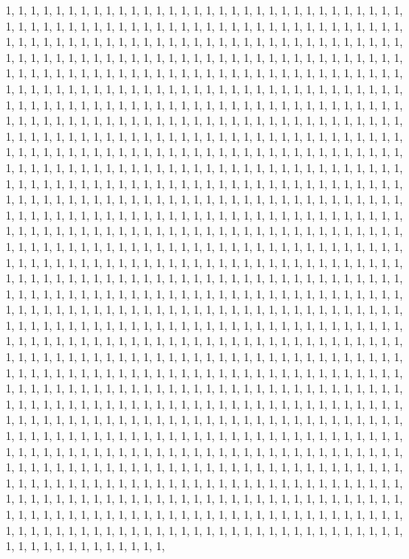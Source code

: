 \documentclass[
]{article}
\begin{document}
\begin{Schunk}
\begin{Soutput}
1, 1, 1, 1, 1, 1, 1, 1, 1, 1, 1, 1, 1, 1, 1, 1, 1, 1, 1, 1, 1, 1, 1, 1, 1, 1, 1, 1, 1, 1, 1, 1, 1, 1, 1, 1, 1, 1, 1, 1, 1, 1, 1, 1, 1, 1, 1, 1, 1, 1, 1, 1, 1, 1, 1, 1, 1, 1, 1, 1, 1, 1, 1, 1, 1, 1, 1, 1, 1, 1, 1, 1, 1, 1, 1, 1, 1, 1, 1, 1, 1, 1, 1, 1, 1, 1, 1, 1, 1, 1, 1, 1, 1, 1, 1, 1, 1, 1, 1, 1, 1, 1, 1, 1, 1, 1, 1, 1, 1, 1, 1, 1, 1, 1, 1, 1, 1, 1, 1, 1, 1, 1, 1, 1, 1, 1, 1, 1, 1, 1, 1, 1, 1, 1, 1, 1, 1, 1, 1, 1, 1, 1, 1, 1, 1, 1, 1, 1, 1, 1, 1, 1, 1, 1, 1, 1, 1, 1, 1, 1, 1, 1, 1, 1, 1, 1, 1, 1, 1, 1, 1, 1, 1, 1, 1, 1, 1, 1, 1, 1, 1, 1, 1, 1, 1, 1, 1, 1, 1, 1, 1, 1, 1, 1, 1, 1, 1, 1, 1, 1, 1, 1, 1, 1, 1, 1, 1, 1, 1, 1, 1, 1, 1, 1, 1, 1, 1, 1, 1, 1, 1, 1, 1, 1, 1, 1, 1, 1, 1, 1, 1, 1, 1, 1, 1, 1, 1, 1, 1, 1, 1, 1, 1, 1, 1, 1, 1, 1, 1, 1, 1, 1, 1, 1, 1, 1, 1, 1, 1, 1, 1, 1, 1, 1, 1, 1, 1, 1, 1, 1, 1, 1, 1, 1, 1, 1, 1, 1, 1, 1, 1, 1, 1, 1, 1, 1, 1, 1, 1, 1, 1, 1, 1, 1, 1, 1, 1, 1, 1, 1, 1, 1, 1, 1, 1, 1, 1, 1, 1, 1, 1, 1, 1, 1, 1, 1, 1, 1, 1, 1, 1, 1, 1, 1, 1, 1, 1, 1, 1, 1, 1, 1, 1, 1, 1, 1, 1, 1, 1, 1, 1, 1, 1, 1, 1, 1, 1, 1, 1, 1, 1, 1, 1, 1, 1, 1, 1, 1, 1, 1, 1, 1, 1, 1, 1, 1, 1, 1, 1, 1, 1, 1, 1, 1, 1, 1, 1, 1, 1, 1, 1, 1, 1, 1, 1, 1, 1, 1, 1, 1, 1, 1, 1, 1, 1, 1, 1, 1, 1, 1, 1, 1, 1, 1, 1, 1, 1, 1, 1, 1, 1, 1, 1, 1, 1, 1, 1, 1, 1, 1, 1, 1, 1, 1, 1, 1, 1, 1, 1, 1, 1, 1, 1, 1, 1, 1, 1, 1, 1, 1, 1, 1, 1, 1, 1, 1, 1, 1, 1, 1, 1, 1, 1, 1, 1, 1, 1, 1, 1, 1, 1, 1, 1, 1, 1, 1, 1, 1, 1, 1, 1, 1, 1, 1, 1, 1, 1, 1, 1, 1, 1, 1, 1, 1, 1, 1, 1, 1, 1, 1, 1, 1, 1, 1, 1, 1, 1, 1, 1, 1, 1, 1, 1, 1, 1, 1, 1, 1, 1, 1, 1, 1, 1, 1, 1, 1, 1, 1, 1, 1, 1, 1, 1, 1, 1, 1, 1, 1, 1, 1, 1, 1, 1, 1, 1, 1, 1, 1, 1, 1, 1, 1, 1, 1, 1, 1, 1, 1, 1, 1, 1, 1, 1, 1, 1, 1, 1, 1, 1, 1, 1, 1, 1, 1, 1, 1, 1, 1, 1, 1, 1, 1, 1, 1, 1, 1, 1, 1, 1, 1, 1, 1, 1, 1, 1, 1, 1, 1, 1, 1, 1, 1, 1, 1, 1, 1, 1, 1, 1, 1, 1, 1, 1, 1, 1, 1, 1, 1, 1, 1, 1, 1, 1, 1, 1, 1, 1, 1, 1, 1, 1, 1, 1, 1, 1, 1, 1, 1, 1, 1, 1, 1, 1, 1, 1, 1, 1, 1, 1, 1, 1, 1, 1, 1, 1, 1, 1, 1, 1, 1, 1, 1, 1, 1, 1, 1, 1, 1, 1, 1, 1, 1, 1, 1, 1, 1, 1, 1, 1, 1, 1, 1, 1, 1, 1, 1, 1, 1, 1, 1, 1, 1, 1, 1, 1, 1, 1, 1, 1, 1, 1, 1, 1, 1, 1, 1, 1, 1, 1, 1, 1, 1, 1, 1, 1, 1, 1, 1, 1, 1, 1, 1, 1, 1, 1, 1, 1, 1, 1, 1, 1, 1, 1, 1, 1, 1, 1, 1, 1, 1, 1, 1, 1, 1, 1, 1, 1, 1, 1, 1, 1, 1, 1, 1, 1, 1, 1, 1, 1, 1, 1, 1, 1, 1, 1, 1, 1, 1, 1, 1, 1, 1, 1, 1, 1, 1, 1, 1, 1, 1, 1, 1, 1, 1, 1, 1, 1, 1, 1, 1, 1, 1, 1, 1, 1, 1, 1, 1, 1, 1, 1, 1, 1, 1, 1, 1, 1, 1, 1, 1, 1, 1, 1, 1, 1, 1, 1, 1, 1, 1, 1, 1, 1, 1, 1, 1, 1, 1, 1, 1, 1, 1, 1, 1, 1, 1, 1, 1, 1, 1, 1, 1, 1, 1, 1, 1, 1, 1, 1, 1, 1, 1, 1, 1, 1, 1, 1, 1, 1, 1, 1, 1, 1, 1, 1, 1, 1, 1, 1, 1, 1, 1, 1, 1, 1, 1, 1, 1, 1, 1, 1, 1, 1, 1, 1, 1, 1, 1, 1, 1, 1, 1, 1, 1, 1, 1, 1, 1, 1, 1, 1, 1, 1, 1, 1, 1, 1, 1, 1, 1, 1, 1, 1, 1, 1, 1, 1, 1, 1, 1, 1, 1, 1, 1, 1, 1, 1, 1, 1, 1, 1, 1, 1, 1, 1, 1, 1, 1, 1, 1, 1, 1, 1, 1, 1, 1, 1, 1, 1, 1, 1, 1, 1, 1, 1, 1, 1, 1, 1, 1, 1, 1, 1, 1, 1, 1, 1, 1, 1, 1, 1, 1, 1, 1, 1, 1, 1, 1, 1, 1, 1, 1, 1, 1, 1, 1, 1, 1, 1, 1, 1, 1, 1, 1, 1, 1, 1, 1, 1, 1, 1, 1, 1, 1, 1, 1, 1, 1, 1, 1, 1, 1, 1, 1, 1, 1, 1, 1, 1, 1, 1, 1, 1, 1, 1, 1, 1, 1, 1, 1, 1, 1, 1, 1, 1, 1, 1, 1, 1, 1, 1, 1, 1, 1, 1, 1, 1, 1, 1, 1, 1, 1, 1, 1, 1, 1, 1, 1, 1, 1, 1, 1, 1, 1, 1, 1, 1, 1, 1, 1, 1, 1, 1, 1, 1, 1, 1, 1, 1, 1, 1, 1, 1, 1, 1, 1, 1, 1, 1, 1, 1, 1, 1, 1, 1, 1, 1, 1, 1, 1, 1, 1, 1, 1, 1, 1, 1, 1, 1, 1, 1, 
\end{Soutput}
\end{Schunk}
\end{document}
